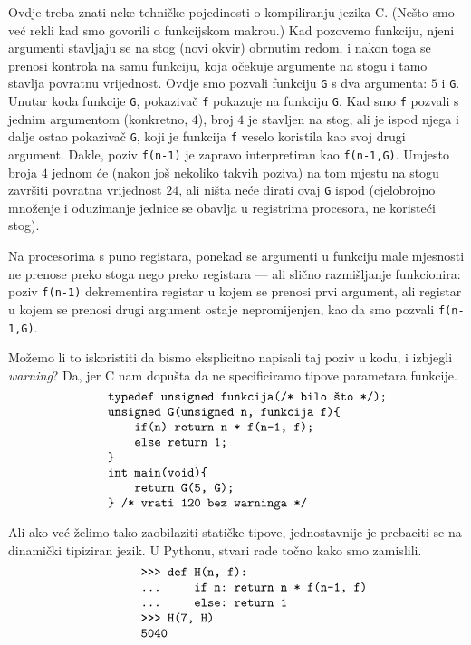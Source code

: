 Ovdje treba znati neke tehničke pojedinosti o kompiliranju jezika C. (Nešto smo već rekli kad smo govorili o funkcijskom makrou.) Kad pozovemo funkciju, njeni argumenti stavljaju se na stog (novi okvir) obrnutim redom, i nakon toga se prenosi kontrola na samu funkciju, koja očekuje argumente na stogu i tamo stavlja povratnu vrijednost. Ovdje smo pozvali funkciju \texttt{G} s dva argumenta: $5$ i \texttt{G}. Unutar koda funkcije \texttt{G}, pokazivač \texttt f pokazuje na funkciju \texttt{G}. Kad smo \texttt f pozvali s jednim argumentom (konkretno, $4$), broj $4$ je stavljen na stog, ali je ispod njega i dalje ostao pokazivač \texttt{G}, koji je funkcija \texttt f veselo koristila kao svoj drugi argument. Dakle, poziv \texttt{f(n-1)} je zapravo interpretiran kao \texttt{f(n-1,G)}. Umjesto broja $4$ jednom će (nakon još nekoliko takvih poziva) na tom mjestu na stogu završiti povratna vrijednost $24$, ali ništa neće dirati ovaj \texttt{G} ispod (cjelobrojno množenje i oduzimanje jednice se obavlja u registrima procesora, ne koristeći stog).

Na procesorima s puno registara, ponekad se argumenti u funkciju male mjesnosti ne prenose preko stoga nego preko registara --- ali slično razmišljanje funkcionira: poziv \texttt{f(n-1)} dekrementira registar u kojem se prenosi prvi argument, ali registar u kojem se prenosi drugi argument ostaje nepromijenjen, kao da smo pozvali \texttt{f(n-1,G)}.

Možemo li to iskoristiti da bismo eksplicitno napisali taj poziv u kodu, i izbjegli \emph{warning}? Da, jer C nam dopušta da ne specificiramo tipove parametara funkcije.
\begin{equation}\begin{minipage}{0.8\textwidth}
\begin{verbatim}
       typedef unsigned funkcija(/* bilo što */);
       unsigned G(unsigned n, funkcija f){
           if(n) return n * f(n-1, f);
           else return 1;
       }
       int main(void){
           return G(5, G);
       } /* vrati 120 bez warninga */
\end{verbatim}
\end{minipage}\end{equation}

Ali ako već želimo tako zaobilaziti statičke tipove, jednostavnije je prebaciti se na dinamički tipiziran jezik. U Pythonu, stvari rade točno kako smo zamislili.
\begin{equation}\begin{minipage}{0.8\textwidth}
\begin{verbatim}
            >>> def H(n, f):
            ...     if n: return n * f(n-1, f)
            ...     else: return 1
            >>> H(7, H)
            5040
\end{verbatim}
\end{minipage}\end{equation}

